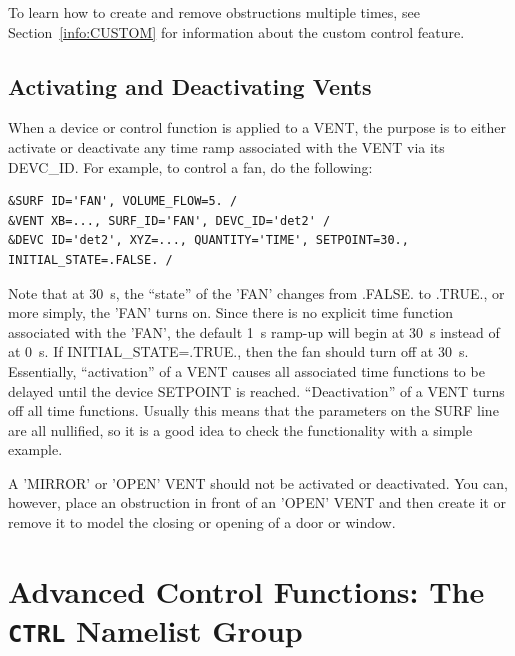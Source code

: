 \documentclass[11pt]{book}
\begin{document}
To learn how to create and remove obstructions multiple times, see Section~\ref{info:CUSTOM} for information about the custom control feature.



\subsection{Activating and Deactivating Vents}
\label{info:activate_deactivate}

When a device or control function is applied to a {\ct VENT}, the purpose is to either activate or deactivate any time ramp associated with the {\ct VENT} via its {\ct DEVC\_ID}. For example, to control a fan, do the following:
\begin{lstlisting}
&SURF ID='FAN', VOLUME_FLOW=5. /
&VENT XB=..., SURF_ID='FAN', DEVC_ID='det2' /
&DEVC ID='det2', XYZ=..., QUANTITY='TIME', SETPOINT=30., INITIAL_STATE=.FALSE. /
\end{lstlisting}
Note that at 30~s, the ``state'' of the {\ct 'FAN'} changes from {\ct .FALSE.} to {\ct .TRUE.}, or more simply, the {\ct 'FAN'} turns on. Since there is no explicit time function associated with the {\ct 'FAN'}, the default 1~s ramp-up will begin at 30~s instead of at 0~s. If {\ct INITIAL\_STATE=.TRUE.}, then the fan should turn off at 30~s. Essentially, ``activation'' of a {\ct VENT} causes all associated time functions to be delayed until the device {\ct SETPOINT} is reached. ``Deactivation'' of a {\ct VENT} turns off all time functions. Usually this means that the parameters on the {\ct SURF} line are all nullified, so it is a good idea to check the functionality with a simple example.

A {\ct 'MIRROR'} or {\ct 'OPEN'} {\ct VENT} should not be activated or deactivated. You can, however, place an obstruction in front of an {\ct 'OPEN'} {\ct VENT} and then create it or remove it to model the closing or opening of a door or window.



\section{Advanced Control Functions: The \texorpdfstring{{\tt CTRL}}{CTRL} Namelist Group}
\label{info:CTRL}
\end{document}
